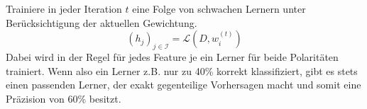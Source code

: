 Trainiere in jeder Iteration $t$ eine Folge von schwachen Lernern unter Berücksichtigung der aktuellen Gewichtung.
$$
    (h_j)_{j\in\mathcal{I}} = \mathcal{L}(D, w^{(t)}_i)
$$
Dabei wird in der Regel für jedes Feature je ein Lerner für beide Polaritäten trainiert. Wenn also ein Lerner z.B. nur zu 40\% korrekt
klassifiziert, gibt es stets einen passenden Lerner, der exakt gegenteilige Vorhersagen macht und somit eine
Präzision von 60\% besitzt. \\[10pt]